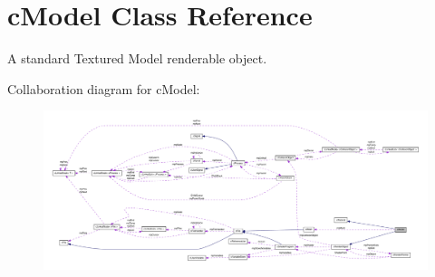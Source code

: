 \hypertarget{classc_model}{
\section{cModel Class Reference}
\label{classc_model}
}


A standard Textured Model renderable object.  




Collaboration diagram for cModel:\nopagebreak
\begin{figure}[H]
\begin{center}
\leavevmode
\includegraphics[width=400pt]{classc_model__coll__graph}
\end{center}
\end{figure}
